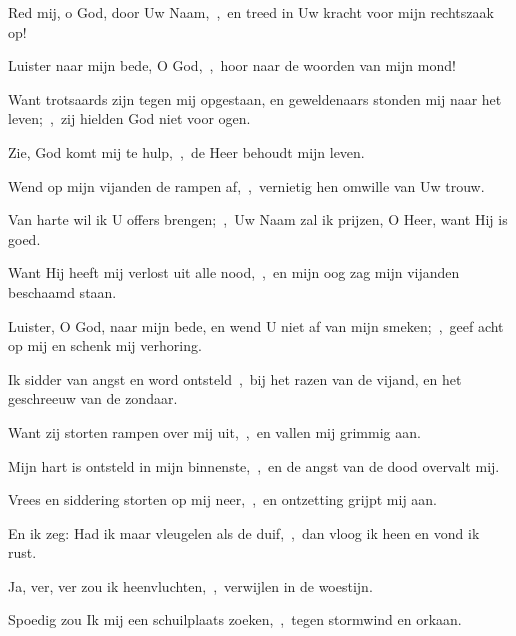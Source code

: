 \documentclass[12pt,twoside,a5paper]{article}
\begin{document}


\begin{halfparskip}
  Red mij, o God, door Uw Naam,~\sep\ en treed in Uw kracht voor mijn rechtszaak op!


  Luister naar mijn bede, O God,~\sep\ hoor naar de woorden van mijn mond!

  Want trotsaards zijn tegen mij opgestaan, en geweldenaars stonden mij naar het leven;~\sep\ zij hielden God niet voor ogen.
\end{halfparskip}


\begin{halfparskip}
  Zie, God komt mij te hulp,~\sep\ de Heer behoudt mijn leven.

  Wend op mijn vijanden de rampen af,~\sep\ vernietig hen omwille van Uw trouw.

  Van harte wil ik U offers brengen;~\sep\ Uw Naam zal ik prijzen, O Heer, want Hij is goed.

  Want Hij heeft mij verlost uit alle nood,~\sep\ en mijn oog zag mijn vijanden beschaamd staan.
\end{halfparskip}



\begin{halfparskip}
  Luister, O God, naar mijn bede, en wend U niet af van mijn smeken;~\sep\ geef acht op mij en schenk mij verhoring.


  Ik sidder van angst en word ontsteld~\sep\ bij het razen van de vijand, en het geschreeuw van de zondaar.

  Want zij storten rampen over mij uit,~\sep\ en vallen mij grimmig aan.

  Mijn hart is ontsteld in mijn binnenste,~\sep\ en de angst van de dood overvalt mij.

  Vrees en siddering storten op mij neer,~\sep\ en ontzetting grijpt mij aan.

  En ik zeg: Had ik maar vleugelen als de duif,~\sep\ dan vloog ik heen en vond ik rust.

  Ja, ver, ver zou ik heenvluchten,~\sep\ verwijlen in de woestijn.

  Spoedig zou Ik mij een schuilplaats zoeken,~\sep\ tegen stormwind en orkaan.
\end{halfparskip}
\end{document}
